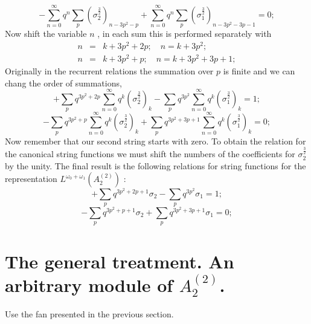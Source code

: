 \documentclass{article}
\begin{document}
\begin{equation*}
-\sum_{n=0}^{\infty }q^{n}\sum_{p}\left( \sigma _{2}^{\frac{3}{2}}\right)
_{n-3p^{2}-p}+\sum_{n=0}^{\infty }q^{n}\sum_{p}\left( \sigma _{1}^{\frac{3}{2%
}}\right) _{n-3p^{2}-3p-1}=0;
\end{equation*}
Now shift the variable $n$ , in each sum this is performed separately with 
\begin{eqnarray*}
n &=&k+3p^{2}+2p;\quad n=k+3p^{2}; \\
n &=&k+3p^{2}+p;\quad n=k+3p^{2}+3p+1;
\end{eqnarray*}
Originally in the recurrent relations the summation over $p$ is finite and
we can chang the order of summations, 
\begin{equation*}
+\sum_{p}q^{3p^{2}+2p}\sum_{n=0}^{\infty }q^{k}\left( \sigma _{2}^{\frac{3}{2%
}}\right) _{k}-\sum_{p}q^{3p^{2}}\sum_{n=0}^{\infty }q^{k}\left( \sigma
_{1}^{\frac{3}{2}}\right) _{k}=1;
\end{equation*}
\begin{equation*}
-\sum_{p}q^{3p^{2}+p}\sum_{n=0}^{\infty }q^{k}\left( \sigma _{2}^{\frac{3}{2}%
}\right) _{k}+\sum_{p}q^{3p^{2}+3p+1}\sum_{n=0}^{\infty }q^{k}\left( \sigma
_{1}^{\frac{3}{2}}\right) _{k}=0;
\end{equation*}
Now remember that our second string starts with zero. To obtain the relation
for the canonical string functions we must shift the numbers of the
coefficients for $\sigma _{2}^{\frac{3}{2}}$ by the unity. The final result
is the following relations for string functions for the representation $%
L^{\omega _{0}+\omega _{1}}(A_{2}^{\left( 2\right) })$ : 
\begin{equation*}
+\sum_{p}q^{3p^{2}+2p+1}\sigma _{2}-\sum_{p}q^{3p^{2}}\sigma _{1}=1;
\end{equation*}
\begin{equation*}
-\sum_{p}q^{3p^{2}+p+1}\sigma _{2}+\sum_{p}q^{3p^{2}+3p+1}\sigma _{1}=0;
\end{equation*}

\section{The general treatment. An arbitrary module of $A_{2}^{\left(
2\right) }$.}

Use the fan presented in the previous section.
\end{document}
